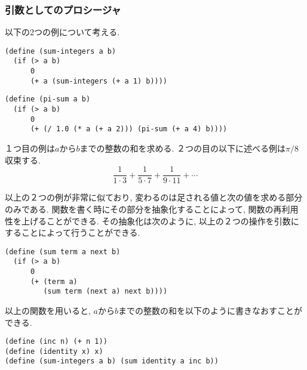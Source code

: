 \subsubsection{引数としてのプロシージャ}
以下の2つの例について考える.
%
\begin{lstlisting}[basicstyle=\footnotesize,title=$a$から$b$までの整数の和]
(define (sum-integers a b)
  (if (> a b)
      0
      (+ a (sum-integers (+ a 1) b))))
\end{lstlisting}
%
\begin{lstlisting}[basicstyle=\footnotesize,title=$\pi/8$に収束する数列]
(define (pi-sum a b)
  (if (> a b)
      0
      (+ (/ 1.0 (* a (+ a 2))) (pi-sum (+ a 4) b))))
\end{lstlisting}

１つ目の例は$a$から$b$までの整数の和を求める. ２つの目の以下に述べる例は$\pi/8$収束する.
\vskip -5mm
\[
  \frac{1}{1\cdot 3} + \frac{1}{5\cdot 7} + \frac{1}{9\cdot 11} + \cdots
\]

以上の２つの例が非常に似ており, 変わるのは足される値と次の値を求める部分のみである.
関数を書く時にその部分を抽象化することによって, 関数の再利用性を上げることができる.
その抽象化は次のように, 以上の２つの操作を引数にすることによって行うことができる.
\newpage
\begin{lstlisting}[basicstyle=\footnotesize,title=一般的な和の関数]
(define (sum term a next b)
  (if (> a b)
      0
      (+ (term a)
         (sum term (next a) next b))))
\end{lstlisting}

以上の関数を用いると, $a$から$b$までの整数の和を以下のように書きなおすことができる.
%
\begin{lstlisting}[basicstyle=\footnotesize,title=一般的な和を用いた$a$から$b$までの整数]
(define (inc n) (+ n 1))
(define (identity x) x)
(define (sum-integers a b) (sum identity a inc b))
\end{lstlisting}
